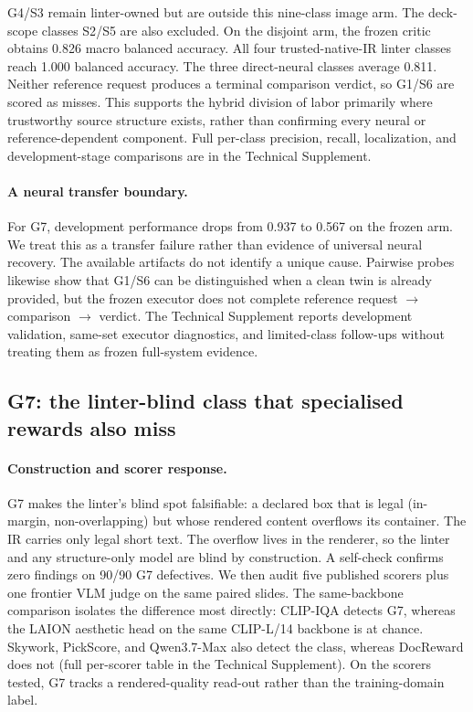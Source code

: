 \documentclass[letterpaper]{article}            %
\newcommand{\g}[1]{\textsf{#1}}        %
\begin{document}
\g{G4}/\g{S3} remain linter-owned but are outside this nine-class image arm. The deck-scope classes
\g{S2}/\g{S5} are also excluded. On the disjoint arm, the frozen critic obtains 0.826 macro balanced accuracy. All four
trusted-native-IR linter classes reach 1.000 balanced accuracy. The three direct-neural classes average 0.811.
Neither
reference request produces a terminal comparison verdict, so \g{G1}/\g{S6} are scored as misses. This supports
the hybrid division of labor primarily where trustworthy source structure exists, rather than confirming every
neural or reference-dependent component. Full per-class precision, recall, localization, and development-stage
comparisons are in the Technical Supplement.

\paragraph{A neural transfer boundary.}
For \g{G7}, development performance drops from 0.937 to 0.567 on the frozen arm. We treat this as a transfer
failure rather than evidence of universal neural recovery. The available artifacts do not identify a unique
cause. Pairwise probes likewise show that \g{G1}/\g{S6} can be distinguished when a clean twin is already
provided, but the frozen executor does not complete reference request $\to$ comparison $\to$ verdict. The
Technical Supplement reports development validation, same-set executor diagnostics, and limited-class
follow-ups without treating them as frozen full-system evidence.

\subsection{\g{G7}: the linter-blind class that specialised rewards also miss}\label{sec:g7}

\paragraph{Construction and scorer response.}
\g{G7} makes the linter's blind spot falsifiable: a declared box that is legal (in-margin, non-overlapping) but
whose rendered content overflows its container. The IR carries only legal short text. The overflow lives in the
renderer, so the linter and any structure-only model are blind by construction. A self-check confirms zero
findings on 90/90 \g{G7} defectives. We then audit five published scorers plus one frontier VLM judge on the
same paired slides. The same-backbone comparison isolates the difference most directly: CLIP-IQA detects \g{G7}, whereas the LAION
aesthetic head on the same CLIP-L/14 backbone is at chance. Skywork, PickScore, and Qwen3.7-Max also detect the
class, whereas DocReward does not (full per-scorer table in the Technical Supplement). On the
scorers tested, \g{G7} tracks a rendered-quality read-out rather than the training-domain label.
\end{document}
